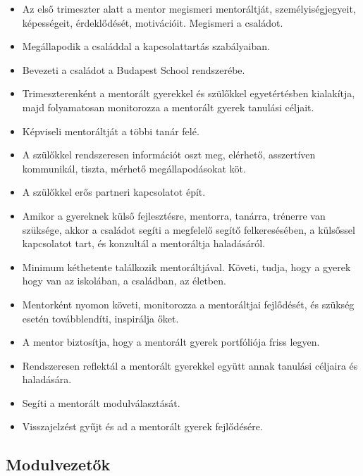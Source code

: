 \begin{itemize}
    \item
          Az első trimeszter alatt a mentor megismeri mentoráltját, személyiségjegyeit, képességeit, érdeklődését, motivációit. Megismeri a családot.
    \item
          Megállapodik a családdal a kapcsolattartás szabályaiban.
    \item
          Bevezeti a családot a Budapest School rendszerébe.
    \item
          Trimeszterenként a mentorált gyerekkel és szülőkkel egyetértésben kialakítja, majd folyamatosan monitorozza a mentorált gyerek tanulási céljait.
    \item
          Képviseli mentoráltját a többi tanár felé.
    \item
          A szülőkkel rendszeresen információt oszt meg, elérhető, asszertíven kommunikál, tiszta, mérhető megállapodásokat köt.
    \item
          A szülőkkel erős partneri kapcsolatot épít.
    \item
          Amikor a gyereknek külső fejlesztésre, mentorra, tanárra, trénerre van szüksége, akkor a családot segíti a megfelelő segítő felkeresésében, a külsőssel kapcsolatot tart, és konzultál a mentoráltja haladásáról.
    \item
          Minimum kéthetente találkozik mentoráltjával. Követi, tudja, hogy a gyerek hogy van az iskolában, a családban, az életben.
    \item
          Mentorként nyomon követi, monitorozza a mentoráltjai fejlődését, és szükség esetén továbblendíti, inspirálja őket.
    \item
          A mentor biztosítja, hogy a mentorált gyerek portfóliója friss legyen.
    \item
          Rendszeresen reflektál a mentorált gyerekkel együtt annak tanulási céljaira és haladására.
    \item
          Segíti a mentorált modulválasztását.
    \item
          Visszajelzést gyűjt és ad a mentorált gyerek fejlődésére.
\end{itemize}

\subsection{Modulvezetők}\label{modulvezetux151k}

